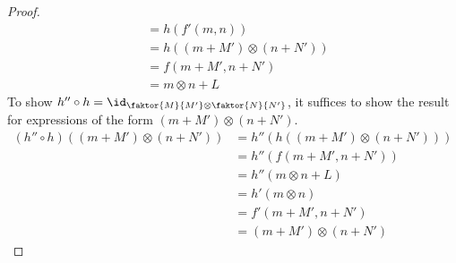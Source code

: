 \begin{proof}
\begin{align*}
        &= h(f'(m, n)) \\
        &= h((m + M') \otimes (n + N')) \\
        &= f(m + M', n + N') \\
        &= m \otimes n + L
    \end{align*}
    To show \( h'' \circ h = \id_{\faktor{M}{M'} \otimes \faktor{N}{N'}} \), it suffices to show the result for expressions of the form \( (m + M') \otimes (n + N') \).
    \begin{align*}
        (h'' \circ h)((m + M') \otimes (n + N')) &= h''(h((m + M') \otimes (n + N'))) \\
        &= h''(f(m + M', n + N')) \\
        &= h''(m \otimes n + L) \\
        &= h'(m \otimes n) \\
        &= f'(m + M', n + N') \\
        &= (m + M') \otimes (n + N')
    \end{align*}
\end{proof}


